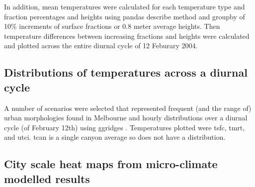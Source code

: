 \documentclass[final,3p,times,authoryear]{elsarticle}
\begin{document}

In addition, mean temperatures were calculated for each temperature type and fraction percentages and heights using pandas \citep{reback2020pandas} describe method and groupby of 10\% increments of surface fractions or 0.8 meter average heights. Then temperature differences between increasing fractions and heights were calculated and plotted across the entire diurnal cycle of 12 Feburary 2004.



\subsection{Distributions of temperatures across a diurnal cycle}\label{sec:methodsdist}
%
% 

A number of scenarios were selected that represented frequent (and the range of) urban morphologies found in Melbourne and hourly distributions over a diurnal cycle (of February 12th) using ggridges \citep{ggridges}. Temperatures plotted were \gls{tsfc}, \gls{tmrt}, and \gls{utci}. \gls{tcan} is a single canyon average so does not have a distribution.


\subsection{City scale heat maps from micro-climate modelled results}\label{sec:methodsheatmaps}
\end{document}

